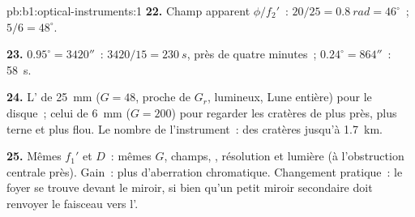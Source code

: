 \begin{solution}{pb:b1:optical-instruments:1}
\textbf{22.} Champ apparent $\phi/f_2'$~: $20/25 = \qty{0.8}{rad} = 46^\circ$~;
$5/6 = 48^\circ$.

\textbf{23.} $0.95^\circ = 3420''$~: $3420/15 = \qty{230}{s}$, près de
quatre minutes~; $0.24^\circ = 864''$~: \qty{58}{s}.

\textbf{24.} L' de \qty{25}{mm} ($G = 48$, proche de $G_r$,
lumineux, Lune entière) pour le disque~; celui de \qty{6}{mm} ($G = 200$)
pour regarder les cratères de plus près, plus terne et plus flou. Le
nombre de l'instrument~: des cratères jusqu'à \qty{1.7}{km}.

\textbf{25.} Mêmes $f_1'$ et $D$~: mêmes $G$, champs, ,
résolution et lumière (à l'obstruction centrale près). Gain~: plus
d'aberration chromatique. Changement pratique~: le foyer se trouve
devant le miroir, si bien qu'un petit miroir secondaire doit renvoyer le
faisceau vers l'.
\end{solution}
